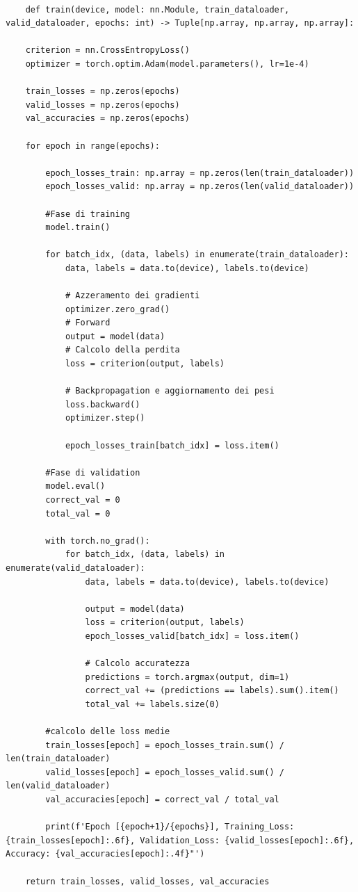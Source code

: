 \begin{lstlisting}

    def train(device, model: nn.Module, train_dataloader, valid_dataloader, epochs: int) -> Tuple[np.array, np.array, np.array]:
    
    criterion = nn.CrossEntropyLoss() 
    optimizer = torch.optim.Adam(model.parameters(), lr=1e-4)
    
    train_losses = np.zeros(epochs)
    valid_losses = np.zeros(epochs)
    val_accuracies = np.zeros(epochs)

    for epoch in range(epochs):
        
        epoch_losses_train: np.array = np.zeros(len(train_dataloader))
        epoch_losses_valid: np.array = np.zeros(len(valid_dataloader))
        
        #Fase di training
        model.train() 

        for batch_idx, (data, labels) in enumerate(train_dataloader):
            data, labels = data.to(device), labels.to(device)
            
            # Azzeramento dei gradienti
            optimizer.zero_grad() 
            # Forward              
            output = model(data) 
            # Calcolo della perdita               
            loss = criterion(output, labels)    
            
            # Backpropagation e aggiornamento dei pesi
            loss.backward()
            optimizer.step()
        
            epoch_losses_train[batch_idx] = loss.item()
        
        #Fase di validation
        model.eval()
        correct_val = 0
        total_val = 0
       
        with torch.no_grad():
            for batch_idx, (data, labels) in enumerate(valid_dataloader):
                data, labels = data.to(device), labels.to(device)

                output = model(data)
                loss = criterion(output, labels)
                epoch_losses_valid[batch_idx] = loss.item()
                
                # Calcolo accuratezza
                predictions = torch.argmax(output, dim=1)
                correct_val += (predictions == labels).sum().item()
                total_val += labels.size(0)
        
        #calcolo delle loss medie
        train_losses[epoch] = epoch_losses_train.sum() / len(train_dataloader)
        valid_losses[epoch] = epoch_losses_valid.sum() / len(valid_dataloader)
        val_accuracies[epoch] = correct_val / total_val
        
        print(f'Epoch [{epoch+1}/{epochs}], Training_Loss: {train_losses[epoch]:.6f}, Validation_Loss: {valid_losses[epoch]:.6f}, Accuracy: {val_accuracies[epoch]:.4f}"')
    
    return train_losses, valid_losses, val_accuracies
\end{lstlisting}

